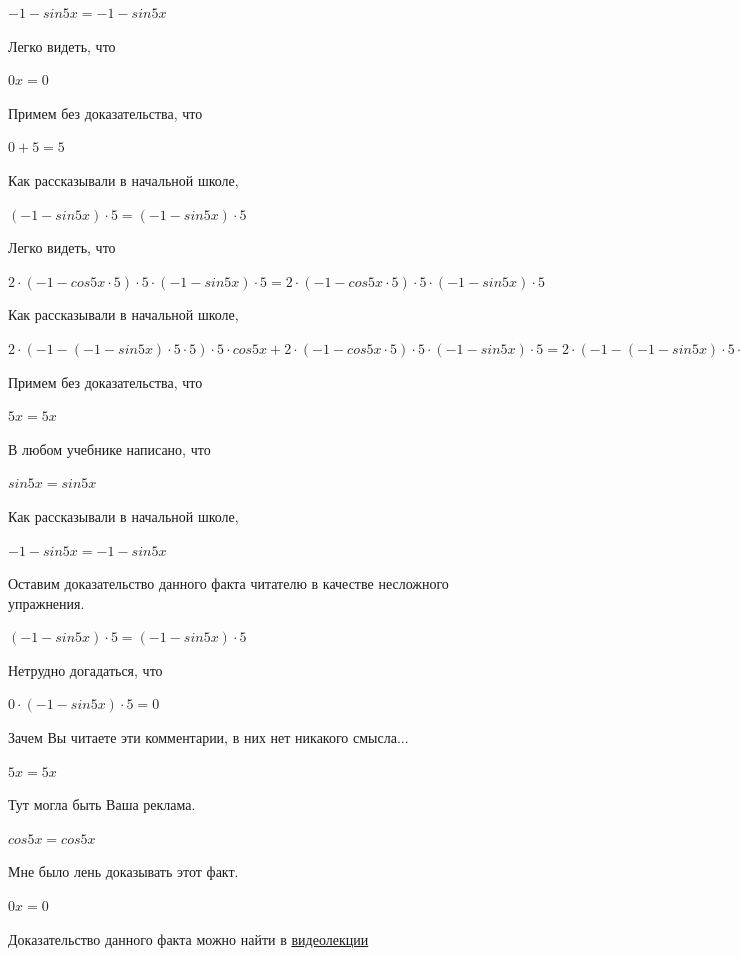 \documentclass[12pt,a4paper,fleqn]{article}
\theoremstyle{definition}
\begin{document}
$ -1  - sin 5  x  =  -1  - sin 5  x $

Легко видеть, что 

$ 0  x  =  0 $

Примем без доказательства, что 

$ 0  +  5  =  5 $

Как рассказывали в начальной школе, 

$( -1  - sin 5  x ) \cdot  5  = ( -1  - sin 5  x ) \cdot  5 $

Легко видеть, что 

$ 2  \cdot ( -1  - cos 5  x  \cdot  5 ) \cdot  5  \cdot ( -1  - sin 5  x ) \cdot  5  =  2  \cdot ( -1  - cos 5  x  \cdot  5 ) \cdot  5  \cdot ( -1  - sin 5  x ) \cdot  5 $

Как рассказывали в начальной школе, 

$ 2  \cdot ( -1  - ( -1  - sin 5  x ) \cdot  5  \cdot  5 ) \cdot  5  \cdot cos 5  x  +  2  \cdot ( -1  - cos 5  x  \cdot  5 ) \cdot  5  \cdot ( -1  - sin 5  x ) \cdot  5  =  2  \cdot ( -1  - ( -1  - sin 5  x ) \cdot  5  \cdot  5 ) \cdot  5  \cdot cos 5  x  +  2  \cdot ( -1  - cos 5  x  \cdot  5 ) \cdot  5  \cdot ( -1  - sin 5  x ) \cdot  5 $

Примем без доказательства, что 

$ 5  x  =  5  x $

В любом учебнике написано, что 

$sin 5  x  = sin 5  x $

Как рассказывали в начальной школе, 

$ -1  - sin 5  x  =  -1  - sin 5  x $

Оставим доказательство данного факта читателю в качестве несложного упражнения. 

$( -1  - sin 5  x ) \cdot  5  = ( -1  - sin 5  x ) \cdot  5 $

Нетрудно догадаться, что 

$ 0  \cdot ( -1  - sin 5  x ) \cdot  5  =  0 $

Зачем Вы читаете эти комментарии, в них нет никакого смысла... 

$ 5  x  =  5  x $

Тут могла быть Ваша реклама. 

$cos 5  x  = cos 5  x $

Мне было лень доказывать этот факт.

$ 0  x  =  0 $

Доказательство данного факта можно найти в \href{https://www.youtube.com/watch?v=dQw4w9WgXcQ}{видеолекции} 
\end{document}
